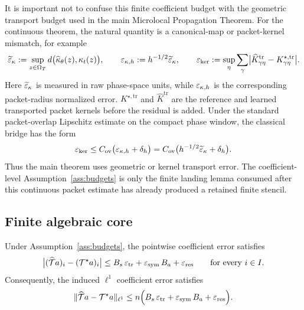 It is important not to confuse this finite coefficient budget with the geometric transport budget used in the main Microlocal Propagation Theorem.  For the continuous theorem, the natural quantity is a canonical-map or packet-kernel mismatch, for example
\[
\widetilde{\varepsilon}_\kappa
:=
\sup_{z\in\Omega_T}
d\bigl(\widehat\kappa_\theta(z),\kappa_t(z)\bigr),
\qquad
\varepsilon_{\kappa,h}:=h^{-1/2}\widetilde{\varepsilon}_\kappa,
\qquad
\varepsilon_{\mathrm{ker}}
:=
\sup_{\eta}
\sum_{\gamma}
\bigl|
\widehat K^{\mathrm{tr}}_{\gamma\eta}
-K^{\star,\mathrm{tr}}_{\gamma\eta}
\bigr|.
\]
Here $\widetilde{\varepsilon}_\kappa$ is measured in raw phase-space units, while
$\varepsilon_{\kappa,h}$ is the corresponding packet-radius normalized error.
$K^{\star,\mathrm{tr}}$ and $\widehat K^{\mathrm{tr}}$ are the reference and learned transported packet kernels before the residual is added.  Under the standard packet-overlap Lipschitz estimate on the compact phase window, the classical bridge has the form
\[
\varepsilon_{\mathrm{ker}}
\le
C_{\mathrm{ov}}\bigl(\varepsilon_{\kappa,h}+\delta_h\bigr)
=
C_{\mathrm{ov}}\bigl(h^{-1/2}\widetilde{\varepsilon}_\kappa+\delta_h\bigr).
\]
Thus the main theorem uses geometric or kernel transport error.  The coefficient-level Assumption~\ref{ass:budgets} is only the finite landing lemma consumed after this continuous packet estimate has already produced a retained finite stencil.

\subsection{Finite algebraic core}

\begin{theorem}
\label{thm:finite-transported-symbol}
Under Assumption~\ref{ass:budgets}, the pointwise coefficient error satisfies
\[
\bigl|(\widehat{\mathcal T}a)_i - (\mathcal T^\star a)_i\bigr|
\le
B_s\,\varepsilon_{\mathrm{tr}} + \varepsilon_{\mathrm{sym}}\, B_a + \varepsilon_{\mathrm{res}}
\qquad\text{for every } i\in I.
\]
Consequently, the induced $\ell^1$ coefficient error satisfies
\[
\|\widehat{\mathcal T}a - \mathcal T^\star a\|_{\ell^1}
\le
n\Bigl(B_s\,\varepsilon_{\mathrm{tr}} + \varepsilon_{\mathrm{sym}}\, B_a + \varepsilon_{\mathrm{res}}\Bigr).
\]
\end{theorem}

